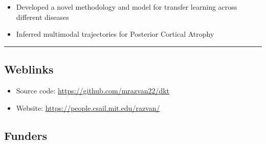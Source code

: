 \documentclass[portrait,a0,final,20pt]{a0poster}
\begin{document}
{\begin{multicols}{2}
\begin{itemize}
\end{itemize}


\begin{itemize}
 \item Developed a novel methodology and model for transfer learning across different diseases
 \item Inferred multimodal trajectories for Posterior Cortical Atrophy
\end{itemize}





\end{multicols}
\hrule


}


\begin{multicols}{2}

\Large{

\raggedcolumns	


\vspace{-1em}
\subsection*{Weblinks}
\begin{itemize}
\item Source code: \url{https://github.com/mrazvan22/dkt}
\item Website: \url{https://people.csail.mit.edu/razvan/}
\end{itemize}
}



\columnbreak

\subsection*{Funders}


\end{multicols}
\end{document}
